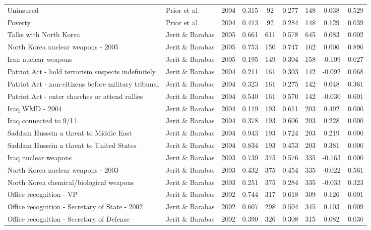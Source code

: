 \begin{longtable}{lllcccccc}
  Uninsured & Prior et al. & 2004 & 0.315 &   92 & 0.277 &  148 & 0.038 & 0.529 \\ 
  Poverty & Prior et al. & 2004 & 0.413 &   92 & 0.284 &  148 & 0.129 & 0.039 \\ 
  Talks with North Korea & Jerit \& Barabas & 2005 & 0.661 &  611 & 0.578 &  645 & 0.083 & 0.002 \\ 
  North Korea nuclear weapons - 2005 & Jerit \& Barabas & 2005 & 0.753 &  150 & 0.747 &  162 & 0.006 & 0.896 \\ 
  Iran nuclear weapons & Jerit \& Barabas & 2005 & 0.195 &  149 & 0.304 &  158 & -0.109 & 0.027 \\ 
  Patriot Act - hold terrorism suspects indefinitely & Jerit \& Barabas & 2004 & 0.211 &  161 & 0.303 &  142 & -0.092 & 0.068 \\ 
  Patriot Act - non-citizens before military tribunal & Jerit \& Barabas & 2004 & 0.323 &  161 & 0.275 &  142 & 0.048 & 0.361 \\ 
  Patriot Act - enter churches or attend rallies & Jerit \& Barabas & 2004 & 0.540 &  161 & 0.570 &  142 & -0.030 & 0.601 \\ 
  Iraq WMD - 2004 & Jerit \& Barabas & 2004 & 0.119 &  193 & 0.611 &  203 & 0.492 & 0.000 \\ 
  Iraq connected to 9/11 & Jerit \& Barabas & 2004 & 0.378 &  193 & 0.606 &  203 & 0.228 & 0.000 \\ 
  Saddam Hussein a threat to Middle East & Jerit \& Barabas & 2004 & 0.943 &  193 & 0.724 &  203 & 0.219 & 0.000 \\ 
  Saddam Hussein a threat to United States & Jerit \& Barabas & 2004 & 0.834 &  193 & 0.453 &  203 & 0.381 & 0.000 \\ 
  Iraq nuclear weapons & Jerit \& Barabas & 2003 & 0.739 &  375 & 0.576 &  335 & -0.163 & 0.000 \\ 
  North Korea nuclear weapons - 2003 & Jerit \& Barabas & 2003 & 0.432 &  375 & 0.454 &  335 & -0.022 & 0.561 \\ 
  North Korea chemical/biological weapons & Jerit \& Barabas & 2003 & 0.251 &  375 & 0.284 &  335 & -0.033 & 0.323 \\ 
  Office recognition - VP & Jerit \& Barabas & 2002 & 0.744 &  317 & 0.618 &  309 & 0.126 & 0.001 \\ 
  Office recognition - Secretary of State - 2002 & Jerit \& Barabas & 2002 & 0.607 &  298 & 0.504 &  345 & 0.103 & 0.009 \\ 
  Office recognition - Secretary of Defense & Jerit \& Barabas & 2002 & 0.390 &  326 & 0.308 &  315 & 0.082 & 0.030 \\ 

\end{longtable}
